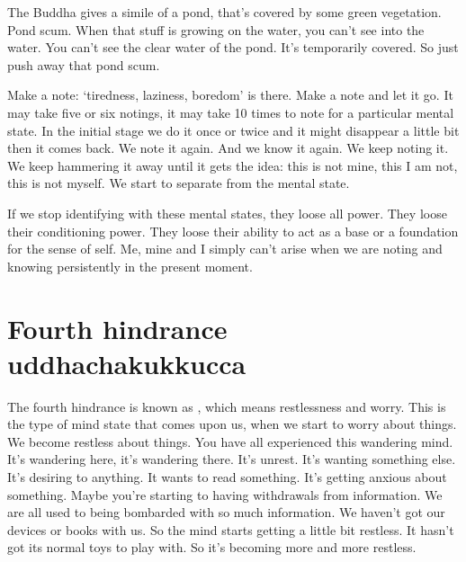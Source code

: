 \documentclass[letterpaper,10pt,english]{sphinxmanual}
\begin{document}
\sphinxAtStartPar
The  Buddha  gives  a  simile  of  a  pond,  that’s  covered  by  some  green
vegetation. Pond scum. When that stuff is growing on the water, you can’t
see into the water. You can’t see the clear water of the pond. It’s temporarily
covered. So just push away that pond scum.

\sphinxAtStartPar
Make a note: ‘tiredness, laziness, boredom’ is there. Make a note and
let it go. It may take five or six notings, it may take 10 times to note for a
particular mental state. In the initial stage we do it once or twice and it might
disappear a little bit then it comes back. We note it again. And we know it
again. We keep noting it. We keep hammering it away until it gets the idea:
this is not mine, this I am not, this is not myself. We start to separate from
the mental state.

\sphinxAtStartPar
If we stop identifying with these mental states, they loose all power.
They loose their conditioning power. They loose their ability to act as a base
or a foundation for the sense of self. Me, mine and I simply can’t arise when
we are noting and knowing persistently in the present moment.


\section{Fourth hindrance uddhachakukkucca}
\label{\detokenize{3-a:fourth-hindrance-uddhachakukkucca}}
\sphinxAtStartPar
The  fourth  hindrance  is  known  as
,  which  means
restlessness and worry. This is the type of mind state that comes upon us,
when we start to worry about things. We become restless about things. You
  have all experienced this wandering mind. It’s wandering here, it’s wandering there. It’s unrest. It’s wanting something else. It’s desiring to anything. It
wants to read something. It’s getting anxious about something. Maybe you’re
starting to having withdrawals from information. We are all used to being
bombarded with so much information. We haven’t got our devices or books
with us. So the mind starts getting a little bit restless. It hasn’t got its normal
toys to play with. So it’s becoming more and more restless.
\end{document}
